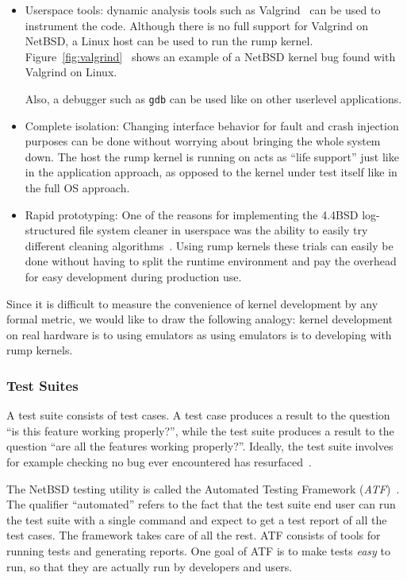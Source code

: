 \begin{itemize}
\item   Userspace tools: dynamic analysis tools such as
	Valgrind~\cite{nethercote:valgrind} can be used to instrument
	the code.  Although there is no full support for
	Valgrind on NetBSD, a Linux host can be used to run
	the rump kernel.
	Figure~\ref{fig:valgrind}~\cite{njoly:valgrind} shows an
	example of a NetBSD kernel bug found with Valgrind on Linux.

	Also, a debugger such as \texttt{gdb} can be used like
	on other userlevel applications.

\item   Complete isolation: Changing interface behavior for
	\eg fault and crash injection~\cite{hsueh:fault,prabhakaran:iron}
	purposes can be done without worrying about bringing the whole
	system down.  The host the rump kernel is running on acts as ``life
	support'' just like in the application approach, as opposed to the
	kernel under test itself like in the full OS approach.

\item   Rapid prototyping: One of the reasons for implementing
	the 4.4BSD log-structured file system cleaner in userspace
	was the ability to easily try different cleaning
	algorithms~\cite{seltzer:lfs}.  Using rump kernels these trials
	can easily be done without having to split the runtime
	environment and pay the overhead for easy development during
	production use.
\end{itemize}

Since it is difficult to measure the convenience of kernel
development by any formal metric, we would like to draw the following
analogy: kernel development on real hardware is to using emulators
as using emulators is to developing with rump kernels.

\subsubsection{Test Suites}

A test suite consists of test cases.  A test case produces a
result to the question ``is this feature working properly?'', while
the test suite produces a result to the question ``are all the
features working properly?''.  Ideally, the test suite involves
for example checking no bug ever encountered has
resurfaced~\cite{bwk:codetesting}.

The NetBSD testing utility is called the Automated Testing Framework
(\textit{ATF})~\cite{jmmv:atf}.  The qualifier ``automated'' refers
to the fact that the test suite end user can run the test suite
with a single command and expect to get a test report of all the
test cases.  The framework takes care of all the rest.  ATF consists
of tools for running tests and generating reports.  One goal of
ATF is to make tests \textit{easy} to run, so that they are actually
run by developers and users.

